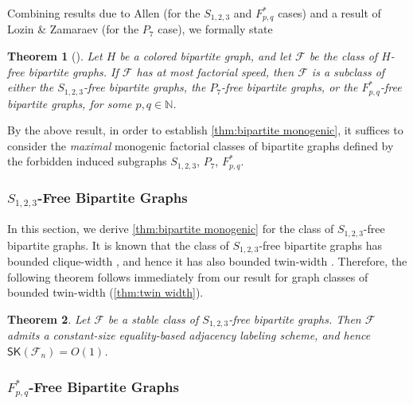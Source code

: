 \documentclass{article}
\newtheorem{theorem}{Theorem}\newtheorem{lemma}[theorem]{Lemma}\newtheorem{proposition}[theorem]{Proposition}\newtheorem{corollary}[theorem]{Corollary}\newtheorem{definition}[theorem]{Definition}\newtheorem{claim}[theorem]{Claim}\newtheorem{remark}[theorem]{Remark}\newtheorem{observation}[theorem]{Observation}\newtheorem{conjecture}[theorem]{Conjecture}\newtheorem{example}[theorem]{Example}
\newcommand{\cF}{\ensuremath{\mathcal{F}}}
\newcommand{\RL}{\mathsf{SK}}
\begin{document}
Combining results due to Allen \cite{All09} (for the $S_{1,2,3}$ and $F^*_{p,q}$ cases) and a result of Lozin \& Zamaraev \cite{LZ17} (for the $P_7$ case), we formally state
\begin{theorem}[\cite{All09,LZ17}]
\label{lem:mongenic-factorial-excludes-P7-S123-Fpq}
Let $H$ be a colored bipartite graph, and let 
$\cF$ be the class of $H$-free bipartite graphs.
If $\cF$ has at most factorial speed, then $\cF$ is a subclass of either the $S_{1,2,3}$-free
bipartite graphs, the $P_7$-free bipartite graphs, or the $F^*_{p,q}$-free bipartite graphs, for some $p,q \in \mathbb{N}$.
\end{theorem}

By the above result, in order to establish \cref{thm:bipartite monogenic}, it suffices to consider
the \emph{maximal} monogenic factorial classes of bipartite graphs defined by the forbidden induced
subgraphs $S_{1,2,3}$, $P_7$, $F_{p,q}^*$.

\subsubsection{\texorpdfstring{$S_{1,2,3}$}{S 1,2,3}-Free Bipartite Graphs}

In this section, we derive \cref{thm:bipartite monogenic} for the class of $S_{1,2,3}$-free bipartite graphs.
It is known that the class of $S_{1,2,3}$-free bipartite graphs has bounded clique-width \cite{LV08},
and hence it has also bounded twin-width \cite{BKTW20}. Therefore, the following theorem
follows immediately from our result for graph classes of bounded twin-width (\cref{thm:twin width}). 

\begin{theorem}
	\label{th:S123 labeling}
	Let $\cF$ be a stable class of $S_{1,2,3}$-free bipartite graphs.
	Then $\cF$ admits a constant-size equality-based adjacency labeling scheme, and hence $\RL(\cF_n) = O(1)$.
\end{theorem}




\subsubsection{\texorpdfstring{$F^*_{p,q}$}{F p,q}-Free Bipartite Graphs}
\label{sec:Fpq}
\end{document}
